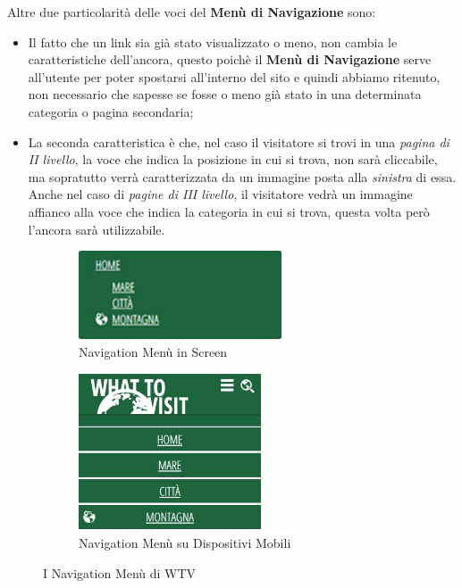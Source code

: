 Altre due particolarità delle voci del \textbf{Menù di Navigazione} sono:
\begin{itemize}
\item Il fatto che un link sia già stato visualizzato o meno, non cambia le caratteristiche dell'ancora, questo poichè il \textbf{Menù di Navigazione} serve all'utente per poter spostarsi all'interno del sito e quindi abbiamo ritenuto, non necessario che sapesse se fosse o meno già stato in una determinata categoria o pagina secondaria;
\item La seconda caratteristica è che, nel caso il visitatore si trovi in una \textit{pagina di II livello}, la voce che indica la posizione in cui si trova, non sarà cliccabile, ma sopratutto verrà caratterizzata da un immagine posta alla \textit{sinistra} di essa. Anche nel caso di \textit{pagine di III livello}, il visitatore vedrà un immagine affianco alla voce che indica la categoria in cui si trova, questa volta però l'ancora sarà utilizzabile.
\end{itemize}
\begin{figure}[h!]
        \centering
        \begin{subfigure}[b]{0.3\textwidth}
                \includegraphics[height=2.63cm,width=6cm]{images/pres_nav.jpg}
                \caption{Navigation Menù in Screen}
                \label{fig:Nav-screen}
        \end{subfigure}
        \hspace{4cm}
        \begin{subfigure}[b]{0.3\textwidth}
                \includegraphics[height=4.65cm,width=5.4cm]{images/pres_nav_m.jpg}
                \caption{Navigation Menù su Dispositivi Mobili}
                \label{fig:Nav-mobile}
        \end{subfigure}
        \caption{I Navigation Menù di WTV}\label{fig:Display-Nav}
\end{figure}


